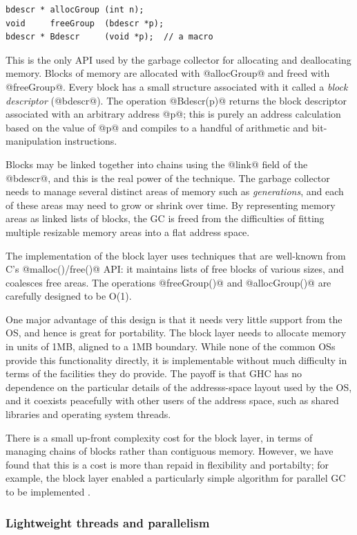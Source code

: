 \documentclass{article}
\let\cite=\citep
\begin{document}
{\begin{verbatim}
bdescr * allocGroup (int n);
void     freeGroup  (bdescr *p);
bdescr * Bdescr     (void *p);  // a macro
\end{verbatim}

This is the only API used by the garbage collector for allocating and
deallocating memory.  Blocks of memory are allocated with @allocGroup@
and freed with @freeGroup@.  Every block has a small structure
associated with it called a \emph{block descriptor} (@bdescr@).  The
operation @Bdescr(p)@ returns the block descriptor associated with an
arbitrary address @p@; this is purely an address calculation based on
the value of @p@ and compiles to a handful of arithmetic and
bit-manipulation instructions.

Blocks may be linked together into chains using the @link@ field of
the @bdescr@, and this is the real power of the technique.  The
garbage collector needs to manage several distinct areas of memory
such as \emph{generations}, and each of these areas may need to grow
or shrink over time.  By representing memory areas as linked lists of
blocks, the GC is freed from the difficulties of fitting multiple
resizable memory areas into a flat address space.

The implementation of the block layer uses techniques that are
well-known from C's @malloc()/free()@ API: it maintains lists of free
blocks of various sizes, and coalesces free areas.  The operations
@freeGroup()@ and @allocGroup()@ are carefully designed to be O(1).

One major advantage of this design is that it needs very little
support from the OS, and hence is great for portability.  The block
layer needs to allocate memory in units of 1MB, aligned to a 1MB
boundary.  While none of the common OSs provide this functionality
directly, it is implementable without much difficulty in terms of the
facilities they do provide.  The payoff is that GHC has no dependence
on the particular details of the addresss-space layout used by the OS,
and it coexists peacefully with other users of the address space, such
as shared libraries and operating system threads.

There is a small up-front complexity cost for the block layer, in
terms of managing chains of blocks rather than contiguous memory.
However, we have found that this is a cost is more than repaid in
flexibility and portabilty; for example, the block layer enabled a
particularly simple algorithm for parallel GC to be implemented
\cite{parallel-gc}.

\subsubsection{Lightweight threads and parallelism}

}
\end{document}

